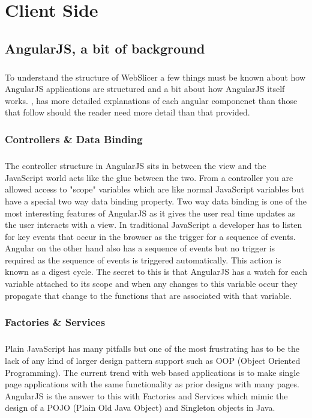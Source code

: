 \chapter{Client Side}

\section{AngularJS, a bit of background}
\paragraph{}
To understand the structure of WebSlicer a few things must be known about how AngularJS applications are structured and a bit about how AngularJS itself works.
\cite{meding-2016}, has more detailed explanations of each angular componenet than those that follow should the reader need more detail than that provided.

\subsection{Controllers \& Data Binding}
\paragraph{}
The controller structure in AngularJS sits in between the view and the JavaScript world acts like the glue between the two.
From a controller you are allowed access to "scope" variables which are like normal JavaScript variables but have a special two way data binding property.
Two way data binding is one of the most interesting features of AngularJS as it gives the user real time updates as the user interacts with a view.
In traditional JavaScript a developer has to listen for key events that occur in the browser as the trigger for a sequence of events.
Angular on the other hand also has a sequence of events but no trigger is required as the sequence of events is triggered automatically.
This action is known as a digest cycle.
The secret to this is that AngularJS has a watch for each variable attached to its scope and when any changes to this variable occur they propagate that change to the functions that are associated with that variable.

\subsection{Factories \& Services}
\paragraph{}
Plain JavaScript has many pitfalls but one of the most frustrating has to be the lack of any kind of larger design pattern support such as OOP (Object Oriented Programming).
The current trend with web based applications is to make single page applications with the same functionality as prior designs with many pages.
AngularJS is the answer to this with Factories and Services which mimic the design of a POJO (Plain Old Java Object) and Singleton objects in Java.

